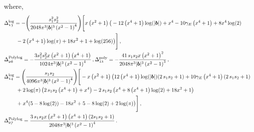 where, 
\begin{align}
    \begin{split}
 &   \Delta_{\mathfrak{13}}^{\textrm{log}}=-\Bigg(\frac{s_{1}^2 s_{2}^2}{2048 \pi ^3 |\boldsymbol{b}|^3 \left(x^2-1\right)^4}\Bigg)\Bigg[x \left(x^2+1\right) \big(-12 \left(x^4+1\right) \log (|\boldsymbol{b}|)+x^4-10 \gamma_E  \left(x^4+1\right)+8 x^4 \log (2)\\&\hspace{0.8cm}-2 \left(x^4+1\right) \log (\pi )+18 x^2+1+\log (256)\big)\Bigg]\,,\\&
    \Delta_{\mathfrak{06}}^{\textrm{Polylog}}=-\frac{3 s_{1}^2 s_{2}^2 x \left(x^2+1\right) \left(x^4+1\right)}{1024 \pi ^3 |\boldsymbol{b}|^3 \left(x^2-1\right)^4}\,,
     \Delta_{\mathfrak{21}}^{\textrm{poly}}=-\frac{41\,s_{1} s_{2} x \left(x^2+1\right)^2}{2048 \pi ^3 |\boldsymbol{b}|^3 \left(x^2-1\right)^3}\,,\\&
       \Delta_{\mathfrak{14}}^{\textrm{log}}=\Bigg(\frac{s_{1}s_{2}}{4096 \pi ^3 |\boldsymbol{b}|^3 \left(x^2-1\right)^4}\Bigg)\Bigg[-x \left(x^2+1\right) \big(12 \left(x^4+1\right) \log (|\boldsymbol{b}|) (2\,s_{1}s_{2}+1)+10 \gamma_E  \left(x^4+1\right) (2\,s_{1} s_{2}+1)\\&\hspace{0.8cm}+2 \log (\pi ) \left(2\,s_{1} s_{2} \left(x^4+1\right)+x^4\right)-2\,s_{1}s_{2} \left(x^4+8 \left(x^4+1\right) \log (2)+18 x^2+1\right)\\&\hspace{0.8cm}+x^4 (5-8 \log (2))-18 x^2+5-8 \log (2)+2 \log (\pi )\big)\Bigg]\,,\\&
       \Delta_{\mathfrak{07}}^{\textrm{Polylog}}=\frac{3 \,s_{1} s_{2} x \left(x^2+1\right) \left(x^4+1\right) (2 s_{1}s_{2}+1)}{2048 \pi ^3 |\boldsymbol{b}|^3 \left(x^2-1\right)^4 }\,.
      \end{split}
\end{align}
